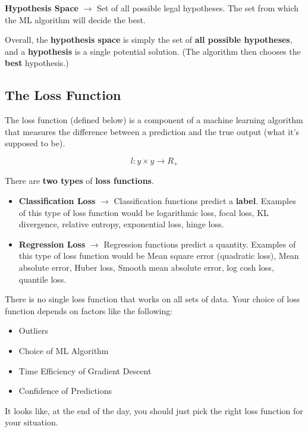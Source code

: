 \documentclass[english, 10pt]{article}
\begin{document}
\begin{tcolorbox}[title=Definition:,colframe=red!75!black,colback=red!5!white,arc=0pt,fonttitle=\bfseries]
\textbf{Hypothesis Space} $\rightarrow$ Set of all possible legal hypotheses. The set from which the ML algorithm will decide the best.
\end{tcolorbox}

\hfill \break Overall, the \textbf{hypothesis space} is simply the set of \textbf{all possible hypotheses}, and a \textbf{hypothesis} is a single potential solution. (The algorithm then chooses the \textbf{best} hypothesis.)

\subsection{The Loss Function}

The loss function (defined below) is a component of a machine learning algorithm that measures the difference between a prediction and the true output (what it's supposed to be).

$$ l:y \times y \rightarrow R_+$$

There are \textbf{two types} of \textbf{loss functions}.
\begin{itemize}
	\item \textbf{Classification Loss} $\rightarrow$ Classification functions predict a \textbf{label}. Examples of this type of loss function would be logarithmic loss, focal loss, KL divergence, relative entropy, exponential loss, hinge loss.
	\item \textbf{Regression Loss} $\rightarrow$ Regression functions predict a quantity. Examples of this type of loss function would be Mean square error (quadratic loss), Mean absolute error, Huber loss, Smooth mean absolute error, log cosh loss, quantile loss.
\end{itemize}

There is no single loss function that works on all sets of data. Your choice of loss function depends on factors like the following:
\begin{itemize}
	\item Outliers
	\item Choice of ML Algorithm
	\item Time Efficiency of Gradient Descent
	\item Confidence of Predictions
\end{itemize}

It looks like, at the end of the day, you should just pick the right loss function for your situation.
\end{document}
